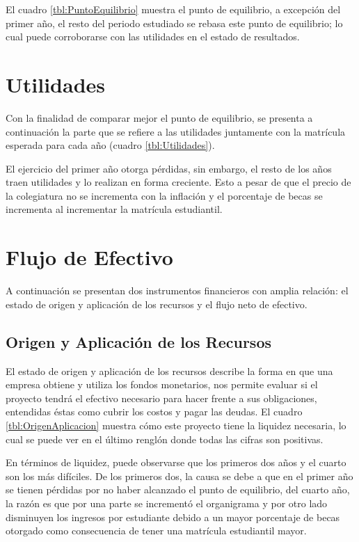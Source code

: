 El cuadro \ref{tbl:PuntoEquilibrio} muestra el punto de equilibrio, a excepción del primer año, el resto del periodo estudiado se rebasa este punto de equilibrio; lo cual puede corroborarse con las utilidades en el estado de resultados.



\section{Utilidades}

Con la finalidad de comparar mejor el punto de equilibrio, se presenta a continuación la parte que se refiere a las utilidades juntamente con la matrícula esperada para cada año (cuadro \ref{tbl:Utilidades}).

El ejercicio del primer año otorga pérdidas, sin embargo, el resto de los años traen utilidades y lo realizan en forma creciente. Esto a pesar de que el precio de la colegiatura no se incrementa con la inflación y el porcentaje de becas se incrementa al incrementar la matrícula estudiantil.



\clearpage
\section{Flujo de Efectivo}

A continuación se presentan dos instrumentos financieros con amplia relación: el estado de origen y aplicación de los recursos y el flujo neto de efectivo.

\subsection{Origen y Aplicación de los Recursos}

El estado de origen y aplicación de los recursos describe la forma en que una empresa obtiene y utiliza los fondos monetarios, nos permite evaluar si el proyecto tendrá el efectivo necesario para hacer frente a sus obligaciones, entendidas éstas como cubrir los costos y pagar las deudas. El cuadro \ref{tbl:OrigenAplicacion} muestra cómo este proyecto tiene la liquidez necesaria, lo cual se puede ver en el último renglón donde todas las cifras son positivas.

En términos de liquidez, puede observarse que los primeros dos años y el cuarto son los más difíciles. De los primeros dos, la causa se debe a que en el primer año se tienen pérdidas por no haber alcanzado el punto de equilibrio, del cuarto año, la razón es que por una parte se incrementó el organigrama y por otro lado disminuyen los ingresos por estudiante debido a un mayor porcentaje de becas otorgado como consecuencia de tener una matrícula estudiantil mayor.

